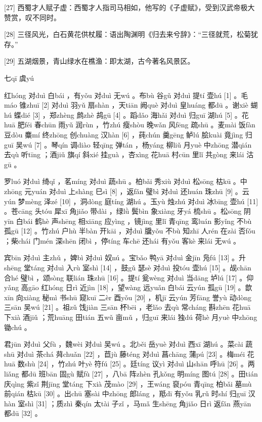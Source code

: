 \documentclass[12pt,UTF8]{ctexbook}
\begin{document}
[27] 西蜀才人赋子虚：西蜀才人指司马相如，他写的《子虚赋》，受到汉武帝极大赞赏，叹不同时。

[28] 三径风光，白石黄花供杖履：语出陶渊明《归去来兮辞》：“三径就荒，松菊犹存。”

[29] 五湖烟景，青山绿水在樵渔：即太湖，古今著名风景区。





七qī 虞yú


红hóng 对duì 白bái ，有yǒu 对duì 无wú 。布bù 谷gǔ 对duì 提tí 壶hú [1] 。毛máo 锥zhuī [2] 对duì 羽yǔ 扇shàn ，天tiān 阙què 对duì 皇huáng 都dū 。谢xiè 蝴hú 蝶dié [3] ，郑zhèng 鹧zhè 鸪gū [4] 。蹈dǎo 海hǎi 对duì 归guī 湖hú [5] 。花huā 肥féi 春chūn 雨yǔ 润rùn ，竹zhú 瘦shòu 晚wǎn 风fēng 疏shū 。麦mài 饭fàn 豆dòu 麋mí 终zhōng 创chuàng 汉hàn [6] ，莼chún 羹gēng 鲈lú 脍kuài 竟jìng 归guī 吴wú [7] 。琴qín 调diào 轻qīng 弹tán ，杨yáng 柳liǔ 月yuè 中zhōng 潜qián 去qù 听tīng ；酒jiǔ 旗qí 斜xié 挂guà ，杏xìng 花huā 村cūn 里lǐ 共gòng 来lái 沽gū 。

罗luó 对duì 绮qǐ ，茗míng 对duì 蔬shū 。柏bǎi 秀xiù 对duì 松sōng 枯kū 。中zhōng 元yuán 对duì 上shàng 巳sì [8] ，返fǎn 璧bì 对duì 还huán 珠zhū [9] 。云yún 梦mèng 泽zé [10] ，洞dòng 庭tíng 湖hú 。玉yù 烛zhú 对duì 冰bīng 壶hú [11] 。苍cāng 头tóu 犀xī 角jiǎo 带dài ，绿lǜ 鬓bìn 象xiàng 牙yá 梳shū 。松sōng 阴yīn 白bái 鹤hè 声shēng 相xiāng 应yìng ，镜jìng 里lǐ 青qīng 鸾luán 影yǐng 不bù 孤gū [12] 。竹zhú 户hù 半bàn 开kāi ，对duì 牖yǒu 不bù 知zhī 人rén 在zài 否fǒu ；柴chái 门mén 深shēn 闭bì ，停tíng 车chē 还hái 有yǒu 客kè 来lái 无wú 。

宾bīn 对duì 主zhǔ ，婢bì 对duì 奴nú 。宝bǎo 鸭yā 对duì 金jīn 凫fú [13] 。升shēng 堂táng 对duì 入rù 室shì [14] ，鼓gǔ 瑟sè 对duì 投tóu 壶hú [15] 。觇chān 合hé 璧bì ，颂sòng 联lián 珠zhū [16] 。提tí 瓮wèng 对duì 当dāng 垆lú [17] 。仰yǎng 高gāo 红hóng 日rì 近jìn [18] ，望wàng 远yuǎn 白bái 云yún 孤gū [19] 。歆xīn 向xiàng 秘mì 书shū 窥kuī 二èr 酉yǒu [20] ，机jī 云yún 芳fāng 誉yù 动dòng 三sān 吴wú [21] 。祖zǔ 饯jiàn 三sān 杯bēi ，老lǎo 去qù 常cháng 斟zhēn 花huā 下xià 酒jiǔ ；荒huāng 田tián 五wǔ 亩mǔ ，归guī 来lái 独dú 荷hè 月yuè 中zhōng 锄chú 。

君jūn 对duì 父fù ，魏wèi 对duì 吴wú 。北běi 岳yuè 对duì 西xī 湖hú 。菜cài 蔬shū 对duì 茶chá 荈chuǎn [22] ，苣jù 藤téng 对duì 菖chāng 蒲pú [23] 。梅méi 花huā 数shù [24] ，竹zhú 叶yè 符fú [25] 。廷tíng 议yì 对duì 山shān 呼hū [26] 。两liǎng 都dū 班bān 固gù 赋fù [27] ，八bā 阵zhèn 孔kǒng 明míng 图tú [28] 。田tián 庆qìng 紫zǐ 荆jīng 堂táng 下xià 茂mào [29] ，王wáng 裒póu 青qīng 柏bǎi 墓mù 前qián 枯kū [30] 。出chū 塞sài 中zhōng 郎láng ，羝dī 有yǒu 乳rǔ 时shí 归guī 汉hàn 室shì [31] ；质zhì 秦qín 太tài 子zǐ ，马mǎ 生shēng 角jiǎo 日rì 返fǎn 燕yān 都dū [32] 。
\end{document}
